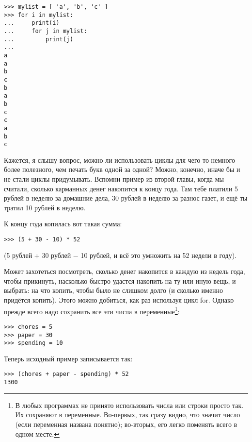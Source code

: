 \begin{listing}
\begin{verbatim}
>>> mylist = [ 'a', 'b', 'c' ]
>>> for i in mylist:
...     print(i)
...     for j in mylist:
...         print(j)
... 
a
a
b
c
b
a
b
c
c
a
b
c
\end{verbatim}
\end{listing}

Кажется, я слышу вопрос, можно ли использовать циклы для чего-то немного более полезного, чем печать букв одной за одной? Можно, конечно, иначе бы и не стали циклы придумывать. Вспомни пример из второй главы, когда мы считали, сколько карманных денег накопится к концу года. Там тебе платили 5 рублей в неделю за домашние дела, 30 рублей в неделю за разнос газет, и ещё ты тратил 10 рублей в неделю.

К концу года копилась вот такая сумма:

\begin{listing}
\begin{verbatim}
>>> (5 + 30 - 10) * 52
\end{verbatim}
\end{listing}

\noindent
(5 рублей + 30 рублей − 10 рублей, и всё это умножить на 52 недели в году).

Может захотеться посмотреть, сколько денег накопится в каждую из недель года, чтобы прикинуть, насколько быстро удастся накопить на ту или иную вещь, и выбрать: на что копить, чтобы было не слишком долго (и сколько именно придётся копить). Этого можно добиться, как раз используя цикл for. Однако прежде всего надо сохранить все эти числа в переменные\footnote{В любых программах не принято использовать числа или строки просто так. Их сохраняют в переменные. Во-первых, так сразу видно, что значит число (если переменная названа понятно); во-вторых, его легко поменять всего в одном месте.}:

\begin{listing}
\begin{verbatim}
>>> chores = 5
>>> paper = 30
>>> spending = 10
\end{verbatim}
\end{listing}

Теперь исходный пример записывается так:

\begin{listing}
\begin{verbatim}
>>> (chores + paper - spending) * 52
1300
\end{verbatim}
\end{listing}

